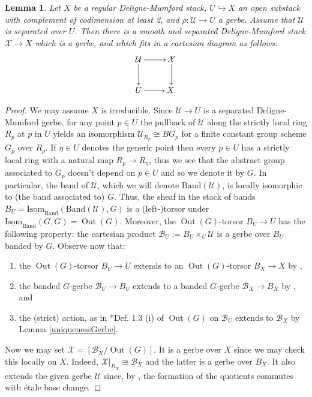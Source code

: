 \documentclass{amsart}
\newcommand{\cB}{\mathcal{B}}
\newcommand{\cU}{\mathcal{U}}
\newcommand{\cX}{\mathcal{X}}
\newcommand{\Out}{\operatorname{Out}}
\newtheorem{Lemma}[theorem]{Lemma}
\theoremstyle{definition}
\begin{document}
 \begin{Lemma}\label{cor_extend_gerbes}
     Let $X$ be a regular Deligne-Mumford stack, $U\hookrightarrow X$ an open substack with complement of codimension at least 2, and $\rho:\cU\to U$ a gerbe. Assume that $\cU$ is separated over $U$. Then there is a smooth and separated Deligne-Mumford stack $\cX\to X$ which is a gerbe, and which fits in a cartesian diagram as follows:
     $$\xymatrix{\cU\ar[r] \ar[d] & \cX\ar[d] \\ U\ar[r] & X.}$$
 \end{Lemma}
\begin{proof}
We may assume $X$ is irreducible. Since $\cU \to U$ is a separated Deligne-Mumford gerbe, for any point $p \in U$ the pullback of $\cU$ along the strictly local ring $R_p$ at $p$ in $U$ yields an isomorphism $\cU_{R_p} \cong BG_p$ for a finite constant group scheme $G_p$ over $R_p$. If $\eta \in U$ denotes the generic point then every $p \in U$ has a strictly local ring with a natural map $R_p \to R_{\eta}$, thus we see that the abstract group associated to $G_p$ doesn't depend on $p \in U$ and so we denote it by $G$. In particular, the band of $\cU$, which we will denote $\mathrm{Band}(\cU)$, is locally isomorphic to (the band associated to) $G$. Thus, the sheaf in the stack of bands $B_U=\underline{\mathrm{Isom}}_{\mathrm{Band}}(\mathrm{Band}(\cU),G)$ is a (left-)torsor under $\underline{\mathrm{Isom}}_{\mathrm{Band}}(G,G)=\operatorname{Out}(G)$.
Moreover, the $\operatorname{Out}(G)$-torsor $B_U\to U$ has the following property: the cartesian product $\cB_U:=B_U\times_U \cU$ is a gerbe over $B_U$ banded by $G$. 
Observe now that:
\begin{enumerate}
    \item the $\operatorname{Out}(G)$-torsor $B_U\to U$ extends to an $\operatorname{Out}(G)$-torsor $B_X\to X$ by , 
    \item the banded $G$-gerbe $\cB_U\to B_U$ extends to a banded $G$-gerbe $\cB_X\to B_X$ by , and
    \item the (strict) action, as in \cite{Rom05}*{Def. 1.3 (i)} of $\Out(G)$ on $\cB_U$ extends to $\cB_X$ by Lemma \ref{uniquenessGerbe}.
\end{enumerate}
Now we may set $\cX=[\cB_X/\Out(G)]$. It is a gerbe over $X$ since we may check this locally on $X$. Indeed, $\cX|_{B_X}\cong \cB_X$ and the latter is a gerbe over $B_X$. It also extends the given gerbe $\cU$ since, by \cite[Prop. 2.6]{Rom05}, the formation of the quotients commutes with \'etale base change.
\end{proof}
\end{document}
